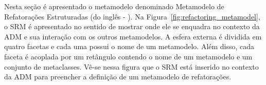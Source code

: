 Nesta seção é apresentado o metamodelo denominado Metamodelo de Refatorações Estruturadas (do inglês - ). %
%
% 
Na Figura~\ref{fig:refactoring_metamodel}, o SRM é apresentado no sentido de mostrar onde ele se enquadra no contexto da ADM e sua interação com os outros metamodelos. A esfera externa é dividida em quatro facetas e cada uma possui o nome de um metamodelo. Além disso, cada faceta é acoplada por um retângulo contendo o nome de um metamodelo e um conjunto de metaclasses. Vê-se nessa figura  que o SRM está inserido no contexto da ADM para preencher a definição de um metamodelo de refatorações. 

